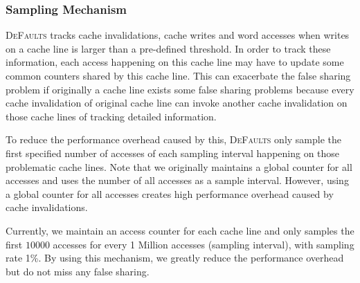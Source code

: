 \documentclass[10pt]{sigplanconf}
\newcommand{\defaults}{{\scshape DeFaults}}
\begin{document}
\subsubsection{Sampling Mechanism}
\defaults{} tracks cache invalidations, cache writes and word accesses when writes on a cache line is larger than a pre-defined threshold.
In order to track these information, 
each access happening on this cache line may have to update some common counters shared by this cache line. 
This can exacerbate the false sharing problem if originally a cache line exists some false sharing problems because every cache 
invalidation of original cache line can invoke another cache invalidation on those cache lines of tracking detailed information.

To reduce the performance overhead caused by this, \defaults{} only sample the first specified
number of accesses of each sampling interval happening on those problematic cache lines. 
Note that we originally maintains a global counter for all accesses and uses the number of 
all accesses as a sample interval. However, using a global counter for all accesses creates 
high performance overhead caused by cache invalidations. 

Currently, we maintain an access counter for each cache line and only samples the first $10000$ accesses 
for every 1 Million accesses (sampling interval), with sampling rate 1\%. By using this mechanism, 
we greatly reduce the performance overhead but do not miss any false sharing.  
\end{document}

